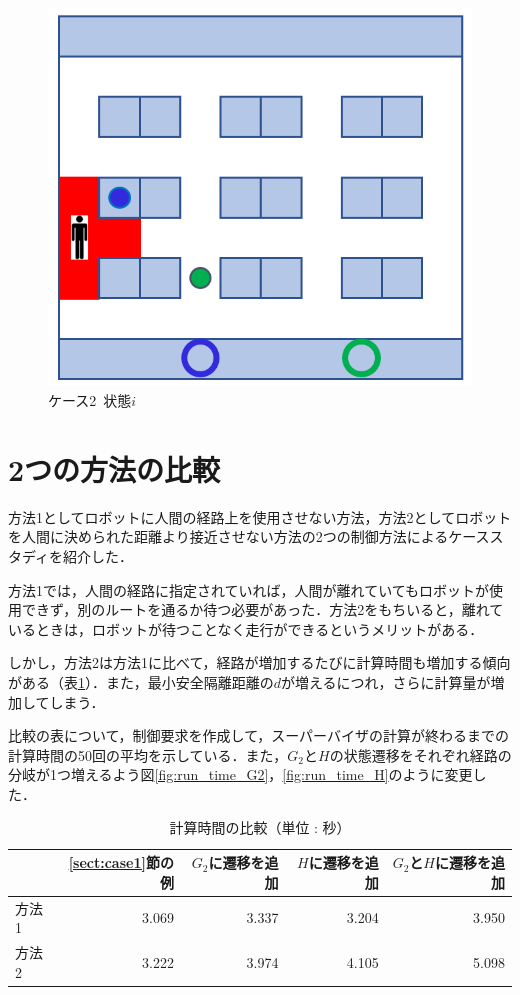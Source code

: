 \begin{figure}[t]
    \centering
    \includegraphics[scale=0.3]{figures/HITL2_case2_i.png}
    \caption{ケース2\ 状態$i$}
    \label{fig:HITL2_case2_i}
\end{figure}


\section{2つの方法の比較}
方法1としてロボットに人間の経路上を使用させない方法，方法2としてロボットを人間に決められた距離より接近させない方法の2つの制御方法によるケーススタディを紹介した．

方法1では，人間の経路に指定されていれば，人間が離れていてもロボットが使用できず，別のルートを通るか待つ必要があった．方法2をもちいると，離れているときは，ロボットが待つことなく走行ができるというメリットがある．

しかし，方法2は方法1に比べて，経路が増加するたびに計算時間も増加する傾向がある（表\ref{tb:run_time}）．また，最小安全隔離距離の$d$が増えるにつれ，さらに計算量が増加してしまう．

比較の表について，制御要求を作成して，スーパーバイザの計算が終わるまでの計算時間の50回の平均を示している．また，$G_2$と$H$の状態遷移をそれぞれ経路の分岐が1つ増えるよう図\ref{fig:run_time_G2}，\ref{fig:run_time_H}のように変更した．

\begin{table}[htb]
  \begin{tabular}{|l|r|r|r|r|} \hline
    &\ref{sect:case1}節の例 & $G_2$に遷移を追加 & $H$に遷移を追加 & $G_2$と$H$に遷移を追加 \\ \hline
    方法1 & 3.069 & 3.337 & 3.204 & 3.950 \\ \hline
    方法2 & 3.222 & 3.974 & 4.105 & 5.098 \\ \hline
  \end{tabular}
  \caption{計算時間の比較（単位 : 秒）}
  \label{tb:run_time}
\end{table}

